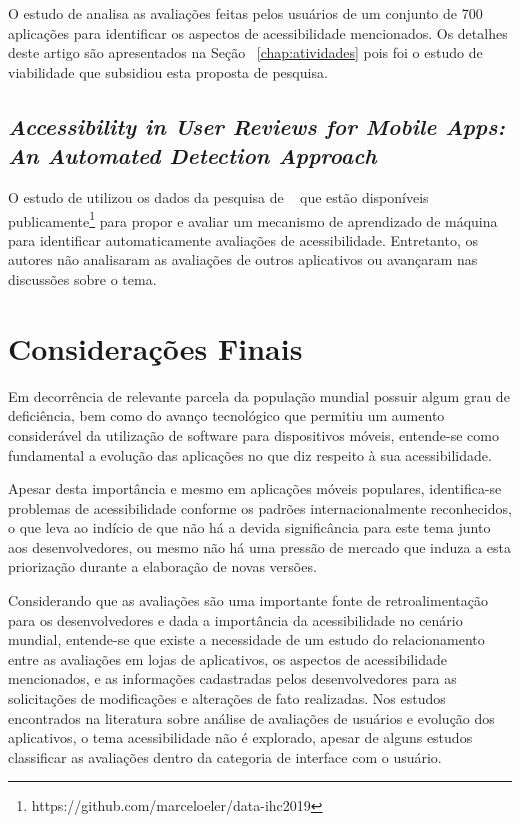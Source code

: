 O estudo de  analisa as avaliações feitas pelos usuários de um conjunto de 700 aplicações para identificar os aspectos de acessibilidade mencionados. Os detalhes deste artigo são apresentados na Seção~ \ref{chap:atividades} pois foi o estudo de viabilidade que subsidiou esta proposta de pesquisa.


\subsection{\textit{Accessibility in User Reviews for Mobile Apps: An Automated Detection Approach}}

O estudo de  utilizou os dados da pesquisa de ~ que estão disponíveis publicamente\footnote{https://github.com/marceloeler/data-ihc2019} para propor e avaliar um mecanismo de aprendizado de máquina para identificar automaticamente avaliações de acessibilidade. Entretanto, os autores não analisaram as avaliações de outros aplicativos ou avançaram nas discussões sobre o tema.


\section{Considerações Finais}
Em decorrência de relevante parcela da população mundial possuir algum grau de deficiência, bem como do avanço tecnológico que permitiu um aumento considerável da utilização de software para dispositivos móveis, entende-se como fundamental a evolução das aplicações no que diz respeito à sua acessibilidade.

Apesar desta importância e mesmo em aplicações móveis populares, identifica-se problemas de acessibilidade conforme os padrões internacionalmente reconhecidos, o que leva ao indício de que não há a devida significância para este tema junto aos desenvolvedores, ou mesmo não há uma pressão de mercado que induza a esta priorização durante a elaboração de novas versões.

Considerando que as avaliações são uma importante fonte de retroalimentação para os desenvolvedores e dada a importância da acessibilidade no cenário mundial, entende-se que existe a necessidade de um estudo do relacionamento entre as avaliações em lojas de aplicativos, os aspectos de acessibilidade mencionados, e as informações cadastradas pelos desenvolvedores para as solicitações de modificações e alterações de fato realizadas. Nos estudos encontrados na literatura sobre análise de avaliações de usuários e evolução dos aplicativos, o tema acessibilidade não é explorado, apesar de alguns estudos classificar as avaliações dentro da categoria de interface com o usuário. 
